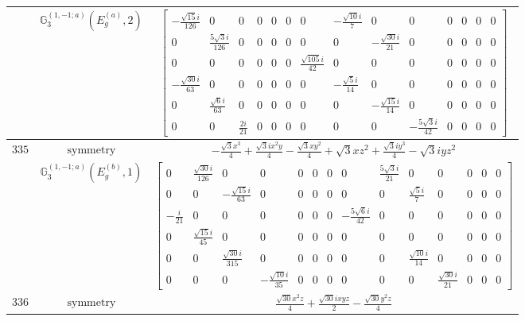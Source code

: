 \documentclass[fleqn,8pt,landscape]{jsarticle}
\begin{document}
\begin{longtable}{ccc}
$  $ & $ \mathbb{G}_{3}^{(1,-1;a)}(E_{g}^{(a)},2) $ & $ \begin{bmatrix} - \frac{\sqrt{15} i}{126} & 0 & 0 & 0 & 0 & 0 & 0 & - \frac{\sqrt{10} i}{7} & 0 & 0 & 0 & 0 & 0 & 0 \\ 0 & \frac{5 \sqrt{3} i}{126} & 0 & 0 & 0 & 0 & 0 & 0 & - \frac{\sqrt{30} i}{21} & 0 & 0 & 0 & 0 & 0 \\ 0 & 0 & 0 & 0 & 0 & 0 & \frac{\sqrt{105} i}{42} & 0 & 0 & 0 & 0 & 0 & 0 & 0 \\ - \frac{\sqrt{30} i}{63} & 0 & 0 & 0 & 0 & 0 & 0 & - \frac{\sqrt{5} i}{14} & 0 & 0 & 0 & 0 & 0 & 0 \\ 0 & \frac{\sqrt{6} i}{63} & 0 & 0 & 0 & 0 & 0 & 0 & - \frac{\sqrt{15} i}{14} & 0 & 0 & 0 & 0 & 0 \\ 0 & 0 & \frac{2 i}{21} & 0 & 0 & 0 & 0 & 0 & 0 & - \frac{5 \sqrt{3} i}{42} & 0 & 0 & 0 & 0 \end{bmatrix} $ \\ \hline
$ 335 $ & $ \text{symmetry} $ & $ - \frac{\sqrt{3} x^{3}}{4} + \frac{\sqrt{3} i x^{2} y}{4} - \frac{\sqrt{3} x y^{2}}{4} + \sqrt{3} x z^{2} + \frac{\sqrt{3} i y^{3}}{4} - \sqrt{3} i y z^{2} $ \\
$  $ & $ \mathbb{G}_{3}^{(1,-1;a)}(E_{g}^{(b)},1) $ & $ \begin{bmatrix} 0 & \frac{\sqrt{30} i}{126} & 0 & 0 & 0 & 0 & 0 & 0 & \frac{5 \sqrt{3} i}{21} & 0 & 0 & 0 & 0 & 0 \\ 0 & 0 & - \frac{\sqrt{15} i}{63} & 0 & 0 & 0 & 0 & 0 & 0 & \frac{\sqrt{5} i}{7} & 0 & 0 & 0 & 0 \\ - \frac{i}{21} & 0 & 0 & 0 & 0 & 0 & 0 & - \frac{5 \sqrt{6} i}{42} & 0 & 0 & 0 & 0 & 0 & 0 \\ 0 & \frac{\sqrt{15} i}{45} & 0 & 0 & 0 & 0 & 0 & 0 & 0 & 0 & 0 & 0 & 0 & 0 \\ 0 & 0 & \frac{\sqrt{30} i}{315} & 0 & 0 & 0 & 0 & 0 & 0 & \frac{\sqrt{10} i}{14} & 0 & 0 & 0 & 0 \\ 0 & 0 & 0 & - \frac{\sqrt{10} i}{35} & 0 & 0 & 0 & 0 & 0 & 0 & \frac{\sqrt{30} i}{21} & 0 & 0 & 0 \end{bmatrix} $ \\ \hline
$ 336 $ & $ \text{symmetry} $ & $ \frac{\sqrt{30} x^{2} z}{4} + \frac{\sqrt{30} i x y z}{2} - \frac{\sqrt{30} y^{2} z}{4} $ \\

\end{longtable}
\end{document}
